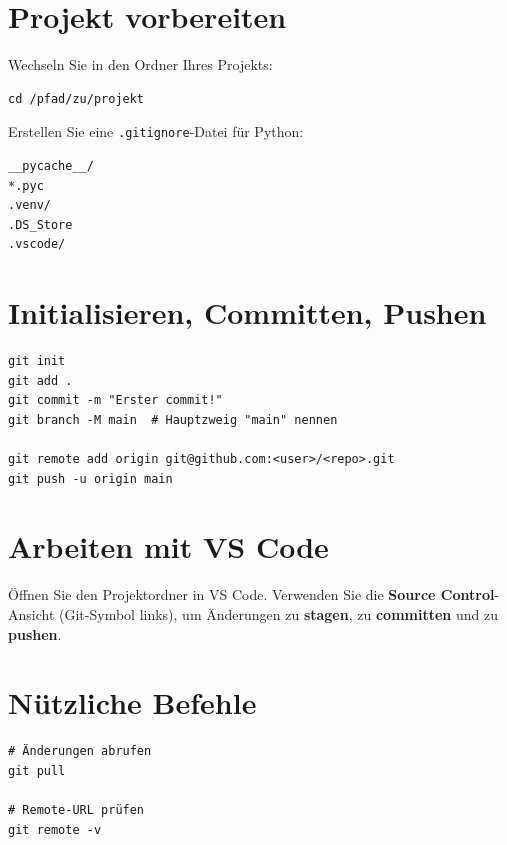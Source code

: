 \section*{Projekt vorbereiten}
Wechseln Sie in den Ordner Ihres Projekts:
\begin{lstlisting}[style=bash]
cd /pfad/zu/projekt
\end{lstlisting}

Erstellen Sie eine \lstinline|.gitignore|-Datei für Python:
\begin{lstlisting}
__pycache__/
*.pyc
.venv/
.DS_Store
.vscode/
\end{lstlisting}

\section*{Initialisieren, Committen, Pushen}
\begin{lstlisting}[style=bash]
git init
git add .
git commit -m "Erster commit!"
git branch -M main  # Hauptzweig "main" nennen

git remote add origin git@github.com:<user>/<repo>.git
git push -u origin main
\end{lstlisting}

\section*{Arbeiten mit VS Code}
Öffnen Sie den Projektordner in VS Code.
Verwenden Sie die \textbf{Source Control}-Ansicht (Git-Symbol links), um Änderungen zu \textbf{stagen}, zu \textbf{committen} und zu \textbf{pushen}.

\section*{Nützliche Befehle}
\begin{lstlisting}[style=bash]
# Änderungen abrufen
git pull

# Remote-URL prüfen
git remote -v
\end{lstlisting}
